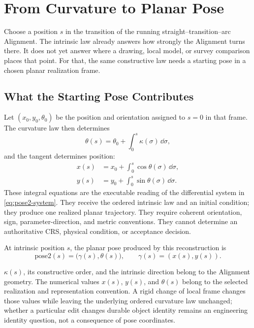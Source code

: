 \chapter{From Curvature to Planar Pose}

Choose a position \(s\) in the transition of the running
straight--transition--arc Alignment. The intrinsic law already answers how
strongly the Alignment turns there. It does not yet answer where a drawing,
local model, or survey comparison places that point. For that, the same
constructive law needs a starting pose in a chosen planar realization frame.

\section{What the Starting Pose Contributes}

Let \((x_0,y_0,\theta_0)\) be the position and orientation assigned to
\(s=0\) in that frame. The curvature law then determines
\begin{equation}
\theta(s)=\theta_0+\int_0^s\kappa(\sigma)\,\dd\sigma,
\label{eq:pose2-heading-integral}
\end{equation}
and the tangent determines position:
\begin{align}
x(s)&=x_0+\int_0^s\cos\theta(\sigma)\,\dd\sigma,
\label{eq:pose2-x-integral}\\
y(s)&=y_0+\int_0^s\sin\theta(\sigma)\,\dd\sigma.
\label{eq:pose2-y-integral}
\end{align}
These integral equations are the executable reading of the differential
system in \cref{eq:pose2-system}. They receive the ordered intrinsic law and
an initial condition; they produce one realized planar trajectory. They
require coherent orientation, sign, parameter-direction, and metric
conventions. They cannot determine an authoritative CRS, physical condition,
or acceptance decision.

\begin{definition}[pose2]
\label{def:pose2}
At intrinsic position \(s\), the planar pose produced by this reconstruction is
\[
\mathrm{pose2}(s)=\bigl(\gamma(s),\theta(s)\bigr),
\qquad
\gamma(s)=(x(s),y(s)).
\]
\end{definition}

\(\kappa(s)\), its constructive order, and the intrinsic direction belong to
the Alignment geometry. The numerical values \(x(s)\), \(y(s)\), and
\(\theta(s)\) belong to the selected realization and representation
convention. A rigid change of local frame changes those values while leaving
the underlying ordered curvature law unchanged; whether a particular edit
changes durable object identity remains an engineering identity question, not
a consequence of pose coordinates.

